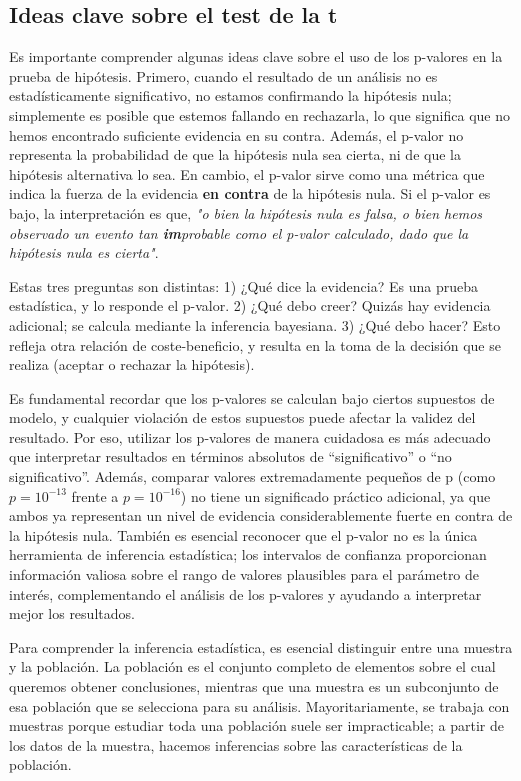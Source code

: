 \documentclass{config/apuntes}\usepackage[]{graphicx}\usepackage[]{xcolor}
\begin{document}
\subsection{Ideas clave sobre el test de la t}
Es importante comprender algunas ideas clave sobre el uso de los p-valores en la prueba de hipótesis. Primero, cuando el resultado de un análisis no es estadísticamente significativo, no estamos confirmando la hipótesis nula; simplemente es posible que estemos fallando en rechazarla, lo que significa que no hemos encontrado suficiente evidencia en su contra. Además, el p-valor no representa la probabilidad de que la hipótesis nula sea cierta, ni de que la hipótesis alternativa lo sea. En cambio, el p-valor sirve como una métrica que indica la fuerza de la evidencia \textbf{en contra} de la hipótesis nula. Si el p-valor es bajo, la interpretación es que, \textit{"o bien la hipótesis nula es falsa, o bien hemos observado un evento tan \textbf{im}probable como el p-valor calculado, dado que la hipótesis nula es cierta"}.

Estas tres preguntas son distintas: 1) ¿Qué dice la evidencia? Es una prueba estadística, y lo responde el p-valor. 2) ¿Qué debo creer? Quizás hay evidencia adicional; se calcula mediante la inferencia bayesiana. 3) ¿Qué debo hacer? Esto refleja otra relación de coste-beneficio, y resulta en la toma de la decisión que se realiza (aceptar o rechazar la hipótesis).

Es fundamental recordar que los p-valores se calculan bajo ciertos supuestos de modelo, y cualquier violación de estos supuestos puede afectar la validez del resultado. Por eso, utilizar los p-valores de manera cuidadosa es más adecuado que interpretar resultados en términos absolutos de “significativo” o “no significativo”. Además, comparar valores extremadamente pequeños de p (como $p = 10^{-13}$ frente a $p = 10^{-16}$) no tiene un significado práctico adicional, ya que ambos ya representan un nivel de evidencia considerablemente fuerte en contra de la hipótesis nula. También es esencial reconocer que el p-valor no es la única herramienta de inferencia estadística; los intervalos de confianza proporcionan información valiosa sobre el rango de valores plausibles para el parámetro de interés, complementando el análisis de los p-valores y ayudando a interpretar mejor los resultados.

Para comprender la inferencia estadística, es esencial distinguir entre una muestra y la población. La población es el conjunto completo de elementos sobre el cual queremos obtener conclusiones, mientras que una muestra es un subconjunto de esa población que se selecciona para su análisis. Mayoritariamente, se trabaja con muestras porque estudiar toda una población suele ser impracticable; a partir de los datos de la muestra, hacemos inferencias sobre las características de la población.
\end{document}
